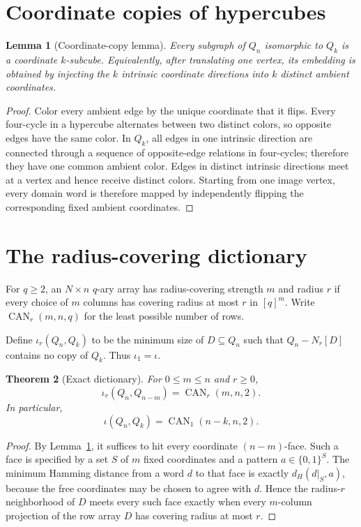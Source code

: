 \documentclass[11pt]{article}
\newtheorem{theorem}{Theorem}[section]
\newtheorem{lemma}[theorem]{Lemma}
\theoremstyle{definition}
\theoremstyle{remark}
\newcommand{\CAN}{\operatorname{CAN}}
\begin{document}
\section{Coordinate copies of hypercubes}

\begin{lemma}[Coordinate-copy lemma]\label{lem:coordinate-copy}
Every subgraph of $Q_n$ isomorphic to $Q_k$ is a coordinate $k$-subcube.
Equivalently, after translating one vertex, its embedding is obtained by
injecting the $k$ intrinsic coordinate directions into $k$ distinct ambient
coordinates.
\end{lemma}

\begin{proof}
Color every ambient edge by the unique coordinate that it flips.  Every
four-cycle in a hypercube alternates between two distinct colors, so opposite
edges have the same color.  In $Q_k$, all edges in one intrinsic direction are
connected through a sequence of opposite-edge relations in four-cycles;
therefore they have one common ambient color.  Edges in distinct intrinsic
directions meet at a vertex and hence receive distinct colors.  Starting from
one image vertex, every domain word is therefore mapped by independently
flipping the corresponding fixed ambient coordinates.
\end{proof}

\section{The radius-covering dictionary}

For $q\ge2$, an $N\times n$ $q$-ary array has radius-covering strength $m$ and
radius $r$ if every choice of $m$ columns has covering radius at most $r$ in
$[q]^m$.  Write $\CAN_r(m,n,q)$ for the least possible number of rows.

Define $\iota_r(Q_n,Q_k)$ to be the minimum size of $D\subseteq Q_n$ such that
$Q_n-N_r[D]$ contains no copy of $Q_k$.  Thus $\iota_1=\iota$.

\begin{theorem}[Exact dictionary]\label{thm:dictionary}
For $0\le m\le n$ and $r\ge0$,
\[
  \iota_r(Q_n,Q_{n-m})=\CAN_r(m,n,2).
\]
In particular,
\[
  \iota(Q_n,Q_k)=\CAN_1(n-k,n,2).
\]
\end{theorem}

\begin{proof}
By Lemma~\ref{lem:coordinate-copy}, it suffices to hit every coordinate
$(n-m)$-face.  Such a face is specified by a set $S$ of $m$ fixed coordinates
and a pattern $a\in\{0,1\}^S$.  The minimum Hamming distance from a word $d$ to
that face is exactly $d_H(d|_S,a)$, because the free coordinates may be chosen
to agree with $d$.  Hence the radius-$r$ neighborhood of $D$ meets every such
face exactly when every $m$-column projection of the row array $D$ has covering
radius at most $r$.
\end{proof}
\end{document}
